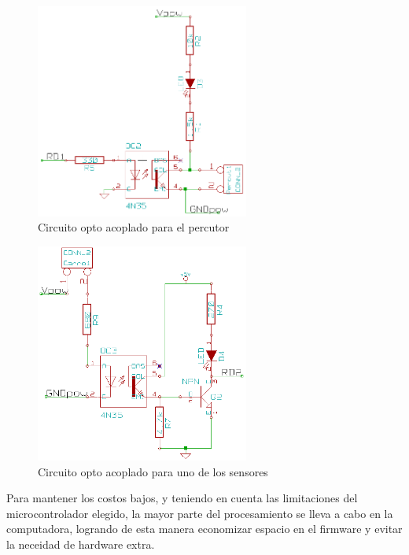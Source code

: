 \begin{figure}[htp]
\centering
\includegraphics[width=7cm]{./img/opto_percutor.png}
\caption{Circuito opto acoplado para el percutor}
\label{fig:opto_percutor}
\end{figure}

\begin{figure}[htp]
\centering
\includegraphics[width=7cm]{./img/opto_sensor.png}
\caption{Circuito opto acoplado para uno de los sensores}
\label{fig:opto_sensor}
\end{figure}



Para mantener los costos bajos, y teniendo en cuenta las limitaciones del
microcontrolador elegido, la mayor parte del procesamiento se lleva a cabo
en la computadora, logrando de esta manera economizar espacio en el firmware y
evitar la neceidad de hardware extra.\\

